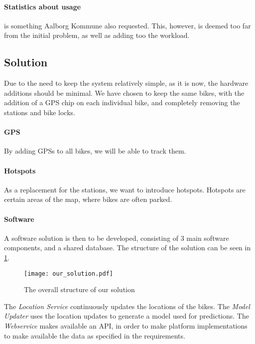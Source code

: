 \paragraph{Statistics about usage} is something Aalborg Kommune also requested.
This, however, is deemed too far from the initial problem, as well as adding too the workload.

\subsection{Solution}
Due to the need to keep the system relatively simple, as it is now, the hardware additions should be minimal.
We have chosen to keep the same bikes, with the addition of a GPS chip on each individual bike, and completely removing the stations and bike locks.

\paragraph{GPS}
\newcommand{\prob}[1]{\textbf{\##1}}
By adding GPSs to all bikes, we will be able to track them.

\paragraph{Hotspots}
As a replacement for the stations, we want to introduce hotspots.
Hotspots are certain areas of the map, where bikes are often parked.

\paragraph{Software}
A software solution is then to be developed, consisting of 3 main software components, and a shared database.
The structure of the solution can be seen in \cref{fig:solution_structure}.

\begin{figure}[h]
\texttt{[image: our\_solution.pdf]}
\caption{The overall structure of our solution}
\label{fig:solution_structure}
\end{figure}

The \textit{Location Service} continuously updates the locations of the bikes.
The \textit{Model Updater} uses the location updates to generate a model used for predictions.
The \textit{Webservice} makes available an API, in order to make platform implementations to make available the data as specified in the requirements.
